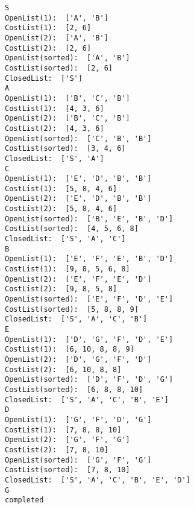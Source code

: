 \documentclass[11pt]{article}
\begin{document}
    \begin{Verbatim}[commandchars=\\\{\}]
S
OpenList(1):  ['A', 'B']
CostList(1):  [2, 6]
OpenList(2):  ['A', 'B']
CostList(2):  [2, 6]
OpenList(sorted):  ['A', 'B']
CostList(sorted):  [2, 6]
ClosedList:  ['S']
A
OpenList(1):  ['B', 'C', 'B']
CostList(1):  [4, 3, 6]
OpenList(2):  ['B', 'C', 'B']
CostList(2):  [4, 3, 6]
OpenList(sorted):  ['C', 'B', 'B']
CostList(sorted):  [3, 4, 6]
ClosedList:  ['S', 'A']
C
OpenList(1):  ['E', 'D', 'B', 'B']
CostList(1):  [5, 8, 4, 6]
OpenList(2):  ['E', 'D', 'B', 'B']
CostList(2):  [5, 8, 4, 6]
OpenList(sorted):  ['B', 'E', 'B', 'D']
CostList(sorted):  [4, 5, 6, 8]
ClosedList:  ['S', 'A', 'C']
B
OpenList(1):  ['E', 'F', 'E', 'B', 'D']
CostList(1):  [9, 8, 5, 6, 8]
OpenList(2):  ['E', 'F', 'E', 'D']
CostList(2):  [9, 8, 5, 8]
OpenList(sorted):  ['E', 'F', 'D', 'E']
CostList(sorted):  [5, 8, 8, 9]
ClosedList:  ['S', 'A', 'C', 'B']
E
OpenList(1):  ['D', 'G', 'F', 'D', 'E']
CostList(1):  [6, 10, 8, 8, 9]
OpenList(2):  ['D', 'G', 'F', 'D']
CostList(2):  [6, 10, 8, 8]
OpenList(sorted):  ['D', 'F', 'D', 'G']
CostList(sorted):  [6, 8, 8, 10]
ClosedList:  ['S', 'A', 'C', 'B', 'E']
D
OpenList(1):  ['G', 'F', 'D', 'G']
CostList(1):  [7, 8, 8, 10]
OpenList(2):  ['G', 'F', 'G']
CostList(2):  [7, 8, 10]
OpenList(sorted):  ['G', 'F', 'G']
CostList(sorted):  [7, 8, 10]
ClosedList:  ['S', 'A', 'C', 'B', 'E', 'D']
G
completed
    \end{Verbatim}
\end{document}
